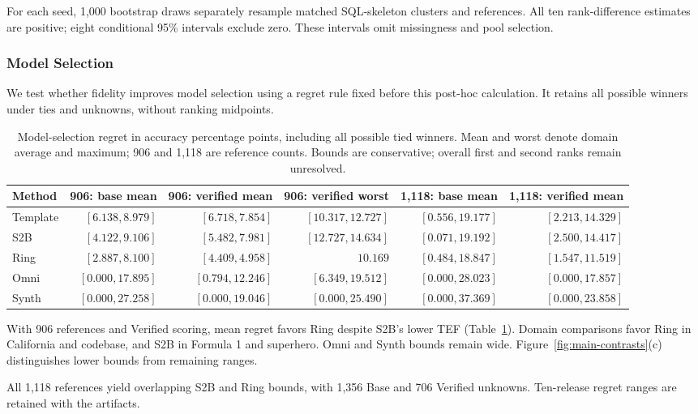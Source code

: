 For each seed, 1,000 bootstrap draws separately resample matched SQL-skeleton clusters and references. All ten rank-difference estimates are positive; eight conditional 95\% intervals exclude zero. These intervals omit missingness and pool selection.

\subsubsection{Model Selection}\label{sec:decision}
We test whether fidelity improves model selection using a regret rule fixed before this post-hoc calculation. It retains all possible winners under ties and unknowns, without ranking midpoints.
\begin{table}[t]\centering\small
\caption{Model-selection regret in accuracy percentage points, including all possible tied winners. Mean and worst denote domain average and maximum; 906 and 1,118 are reference counts. Bounds are conservative; overall first and second ranks remain unresolved.}
\label{tab:regret}
\begin{tabular}{lrrrrr}\toprule
Method & 906: base mean & 906: verified mean & 906: verified worst & 1,118: base mean & 1,118: verified mean\\\midrule
Template & $[6.138, 8.979]$ & $[6.718, 7.854]$ & $[10.317, 12.727]$ & $[0.556, 19.177]$ & $[2.213, 14.329]$\\
S2B & $[4.122, 9.106]$ & $[5.482, 7.981]$ & $[12.727, 14.634]$ & $[0.071, 19.192]$ & $[2.500, 14.417]$\\
Ring & $[2.887, 8.100]$ & $[4.409, 4.958]$ & $10.169$ & $[0.484, 18.847]$ & $[1.547, 11.519]$\\
Omni & $[0.000, 17.895]$ & $[0.794, 12.246]$ & $[6.349, 19.512]$ & $[0.000, 28.023]$ & $[0.000, 17.857]$\\
Synth & $[0.000, 27.258]$ & $[0.000, 19.046]$ & $[0.000, 25.490]$ & $[0.000, 37.369]$ & $[0.000, 23.858]$\\
\bottomrule\end{tabular}\end{table}

With 906 references and Verified scoring, mean regret favors Ring despite S2B's lower TEF (Table~\ref{tab:regret}). Domain comparisons favor Ring in California and codebase, and S2B in Formula 1 and superhero. Omni and Synth bounds remain wide. Figure~\ref{fig:main-contrasts}(c) distinguishes lower bounds from remaining ranges.

All 1,118 references yield overlapping S2B and Ring bounds, with 1,356 Base and 706 Verified unknowns. Ten-release regret ranges are retained with the artifacts.

